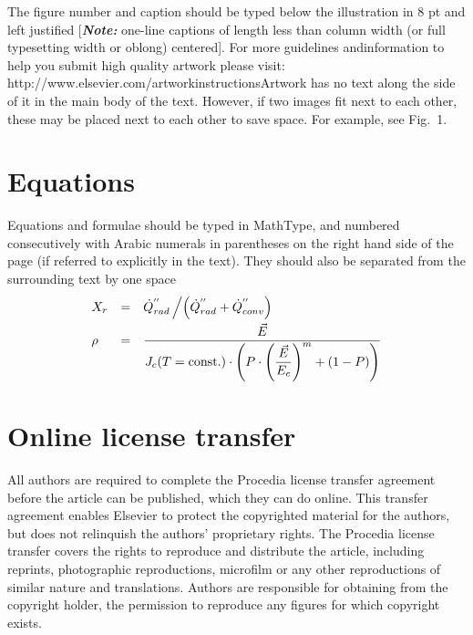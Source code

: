 \documentclass[5p,times,procedia]{elsarticle}
\begin{document}
The figure number and caption should be typed below the illustration in 8 pt and left justified [{\bfseries\itshape Note:} one-line captions of length less than column width (or full typesetting width or oblong) centered]. For more guidelines and\break information to help you submit high quality artwork please visit: http://www.elsevier.com/artworkinstructions\break Artwork has no text along the side of it in the main body of the text. However, if two images fit next to each other, these may be placed next to each other to save space. For example, see Fig.~1.


\section{Equations}
Equations and formulae should be typed in MathType, and numbered consecutively with Arabic numerals in parentheses on the right hand side of the page (if referred to explicitly in the text). They should also be separated from the surrounding text by one space
\begin{equation}
\begin{array}{lcl}
\displaystyle X_r &=& \displaystyle\dot{Q}^{''}_{rad}\left/\left(\dot{Q}^{''}_{rad} + \dot{Q}^{''}_{conv}\right)\right.\\[6pt]
\displaystyle \rho &=& \displaystyle\frac{\vec{E}}{J_c(T={\rm const.})\cdot\left(P\cdot\left(\displaystyle\frac{\vec{E}}{E_c}\right)^m+(1-P)\right)}
\end{array}
\end{equation}


\section{Online license transfer}
All authors are required to complete the Procedia license transfer agreement before the article can be published, which they can do online. This transfer agreement enables Elsevier to protect the copyrighted material for the authors, but does not relinquish the authors’ proprietary rights. The Procedia license transfer covers the rights to reproduce and distribute the article, including reprints, photographic reproductions, microfilm or any other reproductions of similar nature and translations. Authors are responsible for obtaining from the copyright holder, the permission to reproduce any figures for which copyright exists.


\end{document}
